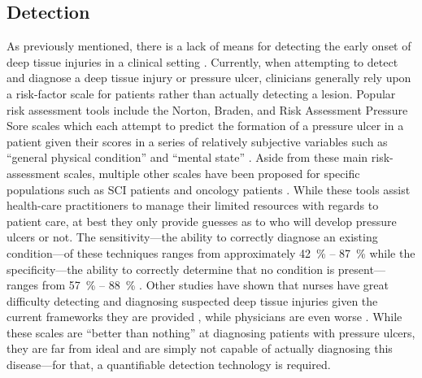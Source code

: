 
		\subsection{Detection}
			As previously mentioned, there is a lack of means for detecting the early onset of deep tissue injuries in a clinical setting \cite{gunningberg08,milne09}. Currently, when attempting to detect and diagnose a deep tissue injury or pressure ulcer, clinicians generally rely upon a risk-factor scale for patients rather than actually detecting a lesion. Popular risk assessment tools include the Norton, Braden, and Risk Assessment Pressure Sore scales which each attempt to predict the formation of a pressure ulcer in a patient given their scores in a series of relatively subjective variables such as ``general physical condition'' and ``mental state'' \cite{norton63,braden94,lindgren02}. Aside from these main risk-assessment scales, multiple other scales have been proposed for specific populations such as SCI patients \cite{salzberg96} and oncology patients \cite{fromantin11}. While these tools assist health-care practitioners to manage their limited resources with regards to patient care, at best they only provide guesses as to who will develop pressure ulcers or not. The sensitivity---the ability to correctly diagnose an existing condition---of these techniques ranges from approximately \SI{42}{\percent} -- \SI{87}{\percent} while the specificity---the ability to correctly determine that no condition is present---ranges from \SI{57}{\percent} -- \SI{88}{\percent} \cite{kallman14}. Other studies have shown that nurses have great difficulty detecting and diagnosing suspected deep tissue injuries given the current frameworks they are provided \cite{lee13}, while physicians are even worse \cite{levine12}. While these scales are ``better than nothing'' at diagnosing patients with pressure ulcers, they are far from ideal and are simply not capable of actually diagnosing this disease---for that, a quantifiable detection technology is required.


